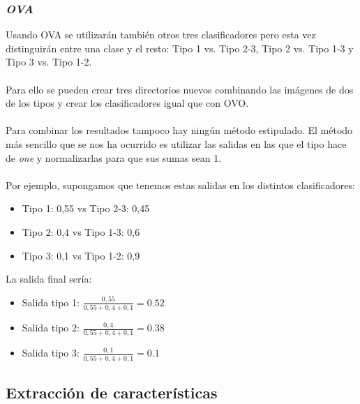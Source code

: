 \subsubsection{\textit{OVA}}

Usando OVA se utilizarán también otros tres clasificadores pero esta vez distinguirán entre una clase y el resto: Tipo 1 vs. Tipo 2-3, Tipo 2 vs. Tipo 1-3 y Tipo 3 vs. Tipo 1-2.
\\ \\
Para ello se pueden crear tres directorios nuevos combinando las imágenes de dos de los tipos y crear los clasificadores igual que con OVO. 
\\ \\
Para combinar los resultados tampoco hay ningún método estipulado. El método más sencillo que se nos ha ocurrido es utilizar las salidas en las que el tipo hace de \textit{one} y normalizarlas para que sus sumas sean 1.
\\ \\
Por ejemplo, supongamos que tenemos estas salidas en los distintos clasificadores:

\begin{itemize}
	\item Tipo 1: 0,55 vs Tipo 2-3: 0,45
	\item Tipo 2: 0,4 vs Tipo 1-3: 0,6
	\item Tipo 3: 0,1 vs Tipo 1-2: 0,9
\end{itemize}

La salida final sería:

\begin{itemize}
	\item Salida tipo 1: $ \frac{0,55}{0,55 + 0,4 + 0,1} = 0.52 $
	\item Salida tipo 2: $ \frac{0,4}{0,55 + 0,4 + 0,1} = 0.38 $
	\item Salida tipo 3: $ \frac{0,1}{0,55 + 0,4 + 0,1} = 0.1 $
\end{itemize}

\subsection{Extracción de características}

